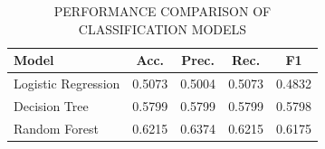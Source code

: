 \begin{table}[t]
\caption{PERFORMANCE COMPARISON OF CLASSIFICATION MODELS}
\label{tab:performance}
\centering
\begin{tabular}{>{\raggedright\arraybackslash}p{1.28in}cccc}
\toprule
Model & Acc. & Prec. & Rec. & F1 \\
\midrule
Logistic Regression & 0.5073 & 0.5004 & 0.5073 & 0.4832 \\
Decision Tree & 0.5799 & 0.5799 & 0.5799 & 0.5798 \\
Random Forest & 0.6215 & 0.6374 & 0.6215 & 0.6175 \\
\bottomrule
\end{tabular}
\end{table}
